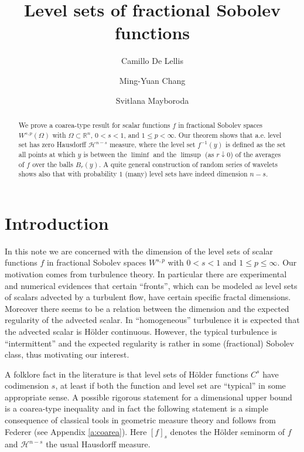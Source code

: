 \documentclass[11pt,reqno]{amsart}
\title{Level sets of fractional Sobolev functions}
\author[C. De Lellis]{Camillo De Lellis}
\author[M. Chang]{Ming-Yuan Chang}
\author[S. Mayboroda]{Svitlana Mayboroda}
\theoremstyle{definition}
\numberwithin{equation}{section}
\begin{document}
\begin{abstract}
We prove a coarea-type result for scalar functions $f$ in fractional Sobolev spaces $W^{s, p} (\Omega)$ with $\Omega\subset \mathbb R^n$, $0<s<1$, and $1\leq p < \infty$. Our theorem shows that a.e. level set has zero Hausdorff $\mathcal{H}^{n-s}$ measure, where the level set $f^{-1} (y)$ is defined as the set all points at which $y$ is between the $\liminf$ and the $\limsup$ (as $r\downarrow 0$) of the averages of $f$ over the balls $B_r (y)$. A quite general construction of random series of wavelets shows also that with probability $1$ (many) level sets have indeed dimension $n-s$.  
\end{abstract}

\maketitle

\tableofcontents

\section{Introduction} 

In this note we are concerned with the dimension of the level sets of scalar functions $f$ in fractional Sobolev spaces $W^{s,p}$ with $0<s<1$ and $1\leq p \leq \infty$. Our motivation comes from turbulence theory. In particular there are experimental and numerical evidences that certain ``fronts'', which can be modeled as level sets of scalars advected by a turbulent flow, have certain specific fractal dimensions. Moreover there seems to be a relation between the dimension and the expected regularity of the advected scalar. In ``homogeneous'' turbulence it is expected that the advected scalar is H\"older continuous. However, the typical turbulence is ``intermittent'' and the expected regularity is rather in some (fractional) Sobolev class, thus motivating our interest. 

A folklore fact in the literature is that level sets of H\"older functions $C^s$ have codimension $s$, at least if both the function and level set are ``typical'' in some appropriate sense. 
A possible rigorous statement for a dimensional upper bound is a coarea-type inequality and in fact the following statement is a simple consequence of classical tools in geometric measure theory and follows from Federer \cite{Federer} (see Appendix \ref{a:coarea}). Here $[f]_s$ denotes the H\"older seminorm of $f$ and $\mathcal{H}^{n-s}$ the usual Hausdorff measure. 
\end{document}
